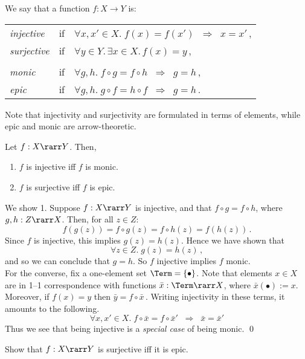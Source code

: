 \documentclass{svmult}
\begin{document}
We say that a function $f : X \longrightarrow Y$ is:
\begin{center}
\begin{tabular}{lll}
\emph{injective} & if &
$\forall x,x'\in X.\;f(x) = f(x') \;\; \Longrightarrow \;\; x = x'$\,, \\
\emph{surjective} & if &
$\forall y \in Y. \, \exists x \in X. \, f(x) = y$\,, \\
\\
\emph{monic} & if &
$\forall g,h.\;f \circ g = f \circ h \;\; \Longrightarrow \;\; g = h$\,, \\
\emph{epic} & if & $\forall g,h.\;g \circ f = h \circ f \;\; \Longrightarrow \;\; g = h$\,.
\end{tabular}
\end{center}
Note that injectivity and surjectivity are formulated in terms of elements, while epic and monic are arrow-theoretic.
\begin{myproposition} Let $f:X\rarr Y$. Then,
\begin{enumerate}\renewcommand{\theenumi}{{\rm\arabic{enumi}}}
\item $f$ is injective iff $f$ is monic.
\item $f$ is surjective iff $f$ is epic.
\end{enumerate}
\end{myproposition}
\proof We show 1. Suppose $f : X \rarr Y$ is injective, and that $f \circ g = f \circ h$, where $g, h : Z \rarr X$. Then, for all $z \in Z$:
\[ f(g(z)) = f \circ g(z) = f \circ h(z) = f(h(z))\,. \]
Since $f$ is injective, this implies $g(z) = h(z)$. Hence we have shown that
\[ \forall z \in Z. \; g(z) = h(z)\,, \]
and so we can conclude that $g = h$. So $f$ injective implies $f$ monic.
\\
For the converse, fix a one-element set $\Term = \{ \bullet \}$. Note that elements $x \in X$ are in 1--1 correspondence with functions $\bar{x} :
\Term \rarr X$, where $\bar{x}(\bullet) := x$. Moreover, if $f(x) = y$ then $\bar{y} = f \circ \bar{x}$\,. Writing injectivity in these terms, it
amounts to the following.
\[ \forall x, x' \in X. \; f \circ \bar{x} = f \circ \bar{x}' \;\; \Longrightarrow \;\; \bar{x} = \bar{x}'  \]
Thus we see that being injective is a \emph{special case} of being monic. \qed
\begin{myexercise}
Show that $f:X\rarr Y$ is surjective iff it is epic.
\end{myexercise}
\end{document}
